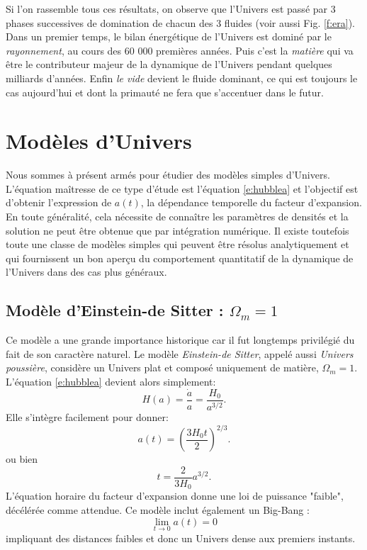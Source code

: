 Si l'on rassemble tous ces résultats, on observe que l'Univers est passé par 3 phases successives de domination de chacun des 3 fluides (voir aussi Fig. \ref{f:era}). Dans un premier temps, le bilan énergétique de l'Univers est dominé par le \textit{rayonnement}, au cours des 60 000 premières années. Puis c'est la \textit{matière} qui va  être le contributeur majeur de la dynamique de l'Univers pendant quelques milliards d'années. Enfin \textit{le vide} devient le fluide dominant, ce qui est toujours le cas aujourd'hui et dont la primauté ne fera que s'accentuer dans le futur.

\section{Modèles d'Univers}
Nous sommes à présent armés pour étudier des modèles simples d'Univers. L'équation maîtresse de ce type d'étude est l'équation \ref{e:hubblea} et l'objectif est d'obtenir l'expression de $a(t)$, la dépendance temporelle du facteur d'expansion. En toute généralité, cela nécessite de connaître les paramètres de densités et la solution ne peut être obtenue que par intégration numérique. Il existe toutefois toute une classe de modèles simples qui peuvent être résolus analytiquement et qui fournissent un bon aperçu du comportement quantitatif de la dynamique de l'Univers dans des cas plus généraux.

\subsection{Modèle d'Einstein-de Sitter : $\Omega_m=1$}
Ce modèle a une grande importance historique car il fut longtemps privilégié du fait de son caractère naturel. Le modèle \textit{Einstein-de Sitter}, appelé aussi \textit{Univers poussière}, considère un Univers plat et composé uniquement de matière, $\Omega_m=1$.  L'équation \ref{e:hubblea} devient alors simplement:
\begin{equation}
H(a)=\frac{\dot a}{a}=\frac{H_0}{a^{3/2 }}.
\end{equation}
Elle s'intègre facilement pour donner:
\begin{equation}
a(t)=\left(\frac{3H_0t}{2}\right)^{2/3}.
\end{equation}
ou bien
\begin{equation}
t=\frac{2}{3H_0}a^{3/2}.
\end{equation}
L'équation horaire du facteur d'expansion donne une loi de puissance "faible", décélérée comme attendue. Ce modèle inclut également un Big-Bang :
\begin{equation}
\lim_{t \to 0} a(t)=0
\end{equation}
impliquant des distances faibles et donc un Univers dense aux premiers instants.

